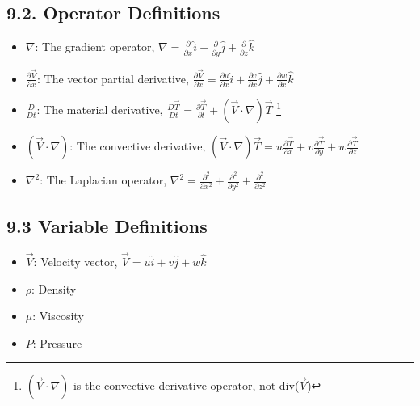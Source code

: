 \subsection*{9.2. Operator Definitions}
\begin{itemize}
    \item $\nabla$: The gradient operator, $\nabla = \frac{\partial}{\partial x} \hat{i} + \frac{\partial}{\partial y} \hat{j} + \frac{\partial}{\partial z} \hat{k}$
    \item $\frac{\partial \vec{V}}{\partial x}$: The vector partial derivative, 
    $\frac{\partial \vec{V}}{\partial x} = \frac{\partial u}{\partial x} \hat{i} + \frac{\partial v}{\partial x} \hat{j} + \frac{\partial w}{\partial x} \hat{k}$
    \item $\frac{D}{Dt}$: The material derivative, $\frac{D \vec{T}}{Dt} = \frac{\partial \vec{T}}{\partial t} + (\vec{V} \cdot \nabla) \vec{T}$
    \footnote[1]{$(\vec{V} \cdot \nabla)$ is the convective derivative operator, not div($\vec{V}$)}
    \item $(\vec{V} \cdot \nabla)$: The convective derivative, $(\vec{V} \cdot \nabla) \vec{T} = u \frac{\partial \vec{T}}{\partial x} + v \frac{\partial \vec{T}}{\partial y} + w \frac{\partial \vec{T}}{\partial z}$
    \item $\nabla^2$: The Laplacian operator, $\nabla^2 = \frac{\partial^2}{\partial x^2} + \frac{\partial^2}{\partial y^2} + \frac{\partial^2}{\partial z^2}$
\end{itemize}

\subsection*{9.3 Variable Definitions}
\begin{itemize}
    \item $\vec{V}$: Velocity vector, $\vec{V} = u \hat{i} + v \hat{j} + w \hat{k}$
    \item $\rho$: Density
    \item $\mu$: Viscosity
    \item $P$: Pressure
\end{itemize}

